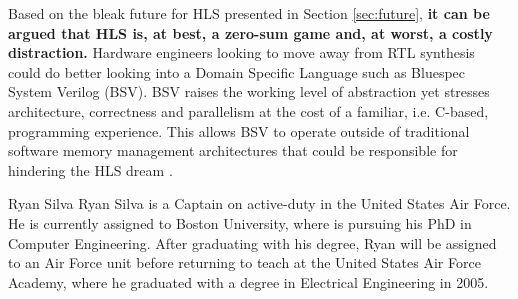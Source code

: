 \documentclass[12pt,journal,compsoc,onecolumn]{IEEEtran}
\begin{document}
Based on the bleak future for HLS presented in Section \ref{sec:future}, \textbf{it can be argued that HLS is, at best, a zero-sum game and, at worst, a costly distraction.} Hardware engineers looking to move away from RTL synthesis could do better looking into a Domain Specific Language such as Bluespec System Verilog (BSV). BSV raises the working level of abstraction yet stresses architecture, correctness and parallelism at the cost of a familiar, i.e. C-based, programming experience\cite{bsv}. This allows BSV to operate outside of traditional software memory management architectures that could be responsible for hindering the HLS dream \cite{bluespec}.




\begin{IEEEbiography}{Ryan Silva}
	Ryan Silva is a Captain on active-duty in the United States Air Force. He is currently assigned to Boston University, where is pursuing his PhD in Computer Engineering. After graduating with his degree, Ryan will be assigned to an Air Force unit before returning to teach at the United States Air Force Academy, where he graduated with a degree in Electrical Engineering in 2005.
\end{IEEEbiography}
\end{document}
